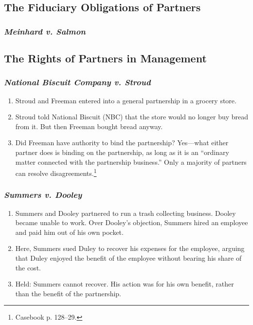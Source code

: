 \subsection{The Fiduciary Obligations of Partners}

\subsubsection{\emph{Meinhard v. Salmon}}


\subsection{The Rights of Partners in Management}

\subsubsection{\emph{National Biscuit Company v. Stroud}}

\begin{enumerate}
    \item Stroud and Freeman entered into a general partnership in a grocery 
    store.
    \item Stroud told National Biscuit (NBC) that the store would no longer 
    buy bread from it. But then Freeman bought bread anyway.
    \item Did Freeman have authority to bind the partnership? Yes---what 
    either partner does is binding on the partnership, as long as it is an 
    ``ordinary matter connected with the partnership business.'' Only a 
    majority of partners can resolve disagreements.\footnote{Casebook p. 
    128--29.}
\end{enumerate}

\subsubsection{\emph{Summers v. Dooley}}

\begin{enumerate}
    \item Summers and Dooley partnered to run a trash collecting business. 
    Dooley became unable to work. Over Dooley's objection, Summers hired an 
    employee and paid him out of his own pocket.
    \item Here, Summers sued Duley to recover his expenses for the employee, 
    arguing that Duley enjoyed the benefit of the employee without bearing his 
    share of the cost.
    \item Held: Summers cannot recover. His action was for his own benefit, 
    rather than the benefit of the partnership. 
\end{enumerate}


